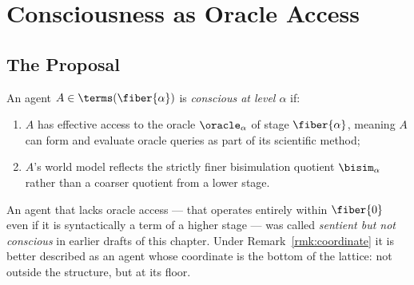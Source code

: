 \chapter{Consciousness as Oracle Access}
\label{sec:consciousness}

\section{The Proposal}

\begin{definition}
\label{def:consciousness}
An agent $A \in \terms(\fiber{\alpha})$ is \emph{conscious at
level $\alpha$} if:
\begin{enumerate}[label=(\roman*)]
  \item $A$ has effective access to the oracle $\oracle_\alpha$ of
        stage $\fiber{\alpha}$, meaning $A$ can form and evaluate
        oracle queries as part of its scientific method;
  \item $A$'s world model reflects the strictly finer bisimulation
        quotient $\bisim_\alpha$ rather than a coarser quotient
        from a lower stage.
\end{enumerate}
An agent that lacks oracle access --- that operates entirely within
$\fiber{0}$ even if it is syntactically a term of a higher stage ---
was called \emph{sentient but not conscious} in earlier drafts of this
chapter.
Under Remark~\ref{rmk:coordinate} it is better described as an agent
whose coordinate is the bottom of the lattice: not outside the
structure, but at its floor.
\end{definition}

